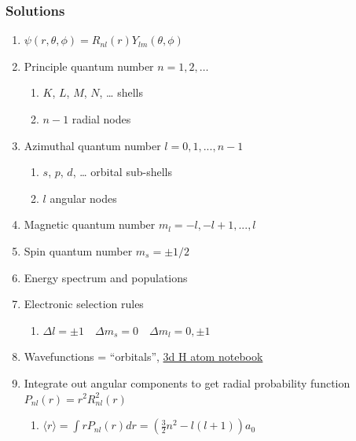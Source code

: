 \documentclass[11pt]{article}
\begin{document}
\subsubsection{Solutions}
\label{sec:orgc1544e8}
\begin{enumerate}
\item \(\psi(r,\theta,\phi)=R_{nl}(r)Y_{lm}(\theta,\phi)\)
\item Principle quantum number \(n=1,2,\ldots\)
\begin{enumerate}
\item \(K\), \(L\), \(M\), \(N\), \ldots{} shells
\item \(n-1\) radial nodes
\end{enumerate}
\item Azimuthal quantum number \(l=0,1,...,n-1\)
\begin{enumerate}
\item \(s\), \(p\), \(d\), \ldots{} orbital sub-shells
\item \(l\) angular nodes
\end{enumerate}
\item Magnetic quantum number \(m_l=-l,-l+1,...,l\)
\item Spin quantum number \(m_s=\pm 1/2\)
\item Energy spectrum and populations
\item Electronic selection rules
\begin{enumerate}
\item \(\Delta l=\pm 1 \quad \Delta m_s =0 \quad \Delta m_l = 0,\pm 1\)
\end{enumerate}
\item Wavefunctions = ``orbitals'',  \href{https://colab.research.google.com/github/wmfschneider/CHE30324/blob/master/Resources/Hydrogen\_3d.ipynb}{3d H atom notebook}
\item Integrate out angular components to get radial probability function \(P_{nl}(r)=r^2 R_{nl}^2(r)\)
\begin{enumerate}
\item \(\langle r\rangle = \int r P_{nl}(r) dr = \left(\frac{3}{2}n^2-l(l+1)\right)a_0\)
\end{enumerate}
\end{enumerate}
\end{document}
